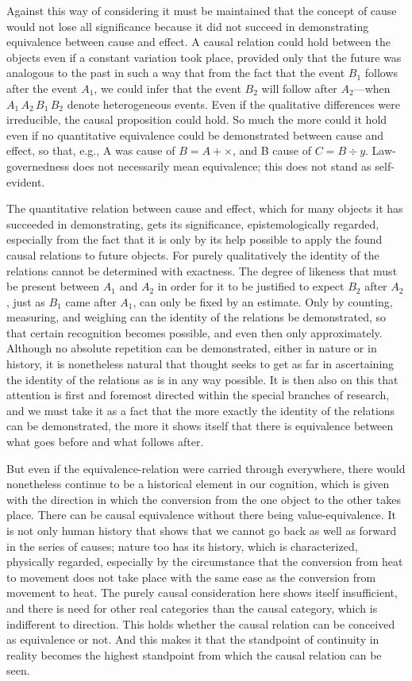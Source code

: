 \documentclass[12pt,a4paper]{book}
\newcommand{\opage}[1]{\marginnote{\footnotesize\textit{[#1]}}}
\begin{document}
Against this way of considering it must be maintained that the concept of
cause would not lose all significance because it did not succeed in
demonstrating equivalence between cause and effect. A causal relation could
hold between the objects even if a constant variation took place, provided
only that the future was analogous to the past in such a way that from the
fact that the event $B_1$ follows after the event $A_1$, we could infer that
the event $B_2$ will follow after $A_2$---when $A_1\,A_2\,B_1\,B_2$ denote
heterogeneous events. Even if the qualitative differences were irreducible,
the causal proposition could hold. So much the more could it hold even if no
quantitative equivalence could be demonstrated between cause and effect, so
that, e.g., A was cause of $B = A + \times$, and B cause of $C = B \div y$.
Law-governedness does not necessarily mean equivalence; this does not stand as
self-evident.

The quantitative relation between cause and effect, which for many objects it
has succeeded in demonstrating, gets its significance, epistemologically
regarded, especially from the fact that it is only by its help possible to
apply the found causal relations to future objects. For purely qualitatively
the identity of the relations cannot be determined with exactness. The degree
of likeness that must be present between $A_1$ and $A_2$ in order for it to be
justified to expect $B_2$ after $A_2$, just as $B_1$ came after $A_1$, can
only be fixed by an estimate. Only by counting, measuring, and weighing can
the identity of the relations be demonstrated, so that certain recognition
becomes possible, and even then only approximately. Although no absolute
repetition can be demonstrated, either in nature or in history, it is
nonetheless natural that thought seeks to get as far in ascertaining the
identity of the relations as is in any way possible. It is then also on this
that attention is first and foremost directed within the special branches of
\opage{215}research, and we must take it as a fact that the more exactly the identity of
the relations can be demonstrated, the more it shows itself that there is
equivalence between what goes before and what follows after.

But even if the equivalence-relation were carried through everywhere, there
would nonetheless continue to be a historical element in our cognition, which
is given with the direction in which the conversion from the one object to the
other takes place. There can be causal equivalence without there being
value-equivalence. It is not only human history that shows that we cannot go
back as well as forward in the series of causes; nature too has its history,
which is characterized, physically regarded, especially by the circumstance
that the conversion from heat to movement does not take place with the same
ease as the conversion from movement to heat. The purely causal consideration
here shows itself insufficient, and there is need for other real categories
than the causal category, which is indifferent to direction. This holds
whether the causal relation can be conceived as equivalence or not. And this
makes it that the standpoint of continuity in reality becomes the highest
standpoint from which the causal relation can be seen.
\end{document}

